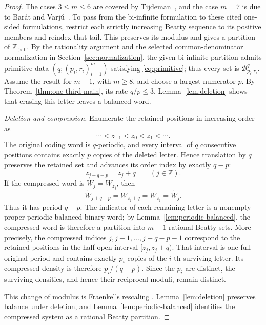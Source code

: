 \documentclass[11pt]{article}
\theoremstyle{definition}
\theoremstyle{remark}
\newcommand{\Z}{\mathbb Z}
\newcommand{\B}{\mathcal B}
\begin{document}
\begin{proof}
The cases \(3\le m\le6\) are covered by
Tijdeman~\cite{Tijdeman2000}, and the case \(m=7\) is due to Bar\'at and
Varj\'u~\cite[Theorem~1.6]{BaratVarju2003}.  To pass from the bi-infinite
formulation to these cited one-sided formulations, restrict each strictly
increasing Beatty sequence to its positive members and reindex that tail.
This preserves its modulus and gives a partition of \(\Z_{>0}\).
By the rationality argument and the selected
common-denominator normalization in Section~\ref{sec:normalization}, the
given bi-infinite partition admits primitive data
\((q;(p_i,r_i)_{i=1}^m)\) satisfying \eqref{eq:primitive}; thus every set
is \(\B^q_{p_i,r_i}\).
Assume the result for \(m-1\), with \(m\ge8\), and choose a largest
numerator \(p\).  By Theorem~\ref{thm:one-third-main}, its rate
\(q/p\le3\).  Lemma~\ref{lem:deletion} shows that erasing this letter
leaves a balanced word.

\smallskip
\noindent\emph{Deletion and compression.}
Enumerate the retained positions in increasing order as
\[
 \cdots<z_{-1}<z_0<z_1<\cdots.
\]
The original coding word is \(q\)-periodic, and every interval of \(q\)
consecutive positions contains exactly \(p\) copies of the deleted letter.
Hence translation by \(q\) preserves the retained set and advances its
order index by exactly \(q-p\):
\[
 z_{j+q-p}=z_j+q\qquad(j\in\Z).
\]
If the compressed word is \(\widetilde W_j=W_{z_j}\), then
\[
 \widetilde W_{j+q-p}=W_{z_j+q}=W_{z_j}=\widetilde W_j.
\]
Thus it has period \(q-p\).  The indicator of each remaining
letter is a nonempty proper periodic balanced binary word; by
Lemma~\ref{lem:periodic-balanced}, the compressed word is therefore a partition
into \(m-1\) rational Beatty sets.  More precisely, the compressed indices
\(j,j+1,\ldots,j+q-p-1\) correspond to the retained positions in the
half-open interval \([z_j,z_j+q)\).  That interval is one full original
period and contains exactly \(p_i\) copies of the \(i\)-th surviving
letter.  Its compressed density is therefore
\(p_i/(q-p)\).  Since the \(p_i\) are distinct, the surviving densities,
and hence their reciprocal moduli, remain distinct.

This change of modulus is Fraenkel's rescaling
\cite[Lemma~6]{Fraenkel1973}.  Lemma~\ref{lem:deletion} preserves balance
under deletion, and Lemma~\ref{lem:periodic-balanced} identifies the
compressed system as a rational Beatty partition.


\end{proof}
\end{document}
